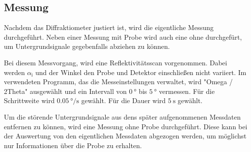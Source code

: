 \subsection{Messung}
\label{subsec:messung}
Nachdem das Diffraktiometer justiert ist, wird
die eigentliche Messung durchgeführt.
Neben einer Messung mit Probe wird auch eine ohne durchgefürt,
um Untergrundsignale gegebenfalls abziehen zu können.

Bei diesem Messvorgang, wird eine Reflektivitätsscan vorgenommen.
Dabei werden $\alpha_{\text{i}}$ und der Winkel den Probe und Detektor einschließen nicht
variiert. Im verwendeten Programm, das die Messeinstellungen verwaltet, wird
"Omega / 2Theta" ausgewählt und ein Intervall von $\SI{0}{\degree}$ bis
$\SI{5}{\degree}$ vermessen.
Für die Schrittweite wird $\SI{0.05}{\degree\per\second}$
gewählt. Für die Dauer wird $\SI{5}{\second}$ gewählt.


Um die störende Untergrundsignale aus dens später aufgenommenen Messdaten
entfernen zu können, wird eine Messung ohne Probe durchgeführt.
Diese kann bei der Auswertung von den eigentlichen Messdaten abgezogen werden,
um möglichst nur Informationen über die Probe zu erhalten.
